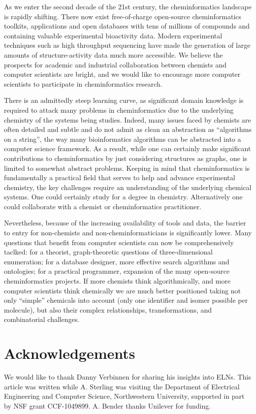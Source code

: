 \documentclass{sig-alternate}
\begin{document}
As we enter the second decade of the 21st century, the cheminformatics
landscape is rapidly shifting.  There now exist free-of-charge
open-source cheminformatics toolkits, applications and open databases
with tens of millions of compounds and containing valuable
experimental bioactivity data. Modern experimental techniques such as
high throughput sequencing have made the generation of large amounts
of structure-activity data much more accessible.  We believe the
prospects for academic and industrial collaboration between chemists
and computer scientists are bright, and we would like to encourage
more computer scientists to participate in cheminformatics research.

There is an admittedly steep learning curve, as significant domain
knowledge is required to attack many problems in cheminformatics due
to the underlying chemistry of the systems being studies. Indeed, many
issues faced by chemists are often detailed and subtle and do not
admit as clean an abstraction as ``algorithms on a string'', the way
many bioinformatics algorithms can be abstracted into a computer
science framework.  As a result, while one can certainly make
significant contributions to cheminformatics by just considering
structures as graphs, one is limited to somewhat abstract
problems. Keeping in mind that cheminformatics is fundamentally a
practical field that serves to help and advance experimental
chemistry, the key challenges require an understanding of the
underlying chemical systems. One could certainly study for a degree in
chemistry. Alternatively one could collaborate with a chemist or
cheminformatics practitioner.

Nevertheless, because of the increasing availability of tools and
data, the barrier to entry for non-chemists and non-cheminformaticians
is significantly lower. Many questions that benefit from computer
scientists can now be comprehensively taclked: for a theorist,
graph-theoretic questions of three-dimensional enumeration; for a
database designer, more effective search algorithms and ontologies;
for a practical programmer, expansion of the many open-source
cheminformatics projects.  If more chemists think algorithmically, and
more computer scientists think chemically we are much better
positioned taking not only ``simple'' chemicals into account (only one
identifier and isomer possible per molecule), but also their complex
relationships, transformations, and combinatorial challenges.

\section{Acknowledgements}
We would like to thank Danny Verbinnen for sharing his insights into
ELNs.  This article was written while A. Sterling was visiting the
Department of Electrical Engineering and Computer Science,
Northwestern University, supported in part by NSF grant
CCF-1049899. A. Bender thanks Unilever for funding.
\end{document}
